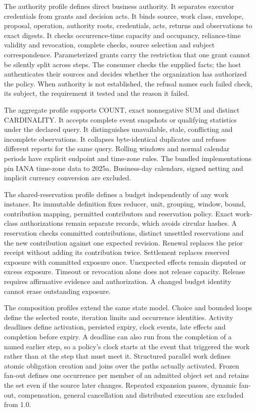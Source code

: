 \documentclass[
  american,
  11pt,
  letterpaper,
]{article}
\begin{document}
The authority profile defines direct business authority. It separates
executor credentials from grants and decision acts. It binds source,
work class, envelope, proposal, operation, authority roots, credentials,
acts, returns and observations to exact digests. It checks
occurrence-time capacity and occupancy, reliance-time validity and
revocation, complete checks, source selection and subject
correspondence. Parameterized grants carry the restriction that one
grant cannot be silently split across steps. The consumer checks the
supplied facts; the host authenticates their sources and decides whether
the organization has authorized the policy. When authority is not
established, the refusal names each failed check, its subject, the
requirement it tested and the reason it failed.

The aggregate profile supports COUNT, exact nonnegative SUM and distinct
CARDINALITY. It accepts complete event snapshots or qualifying
statistics under the declared query. It distinguishes unavailable,
stale, conflicting and incomplete observations. It collapses
byte-identical duplicates and refuses different reports for the same
query. Rolling windows and normal calendar periods have explicit
endpoint and time-zone rules. The bundled implementations pin IANA
time-zone data to 2025a. Business-day calendars, signed netting and
implicit currency conversion are excluded.

The shared-reservation profile defines a budget independently of any
work instance. Its immutable definition fixes reducer, unit, grouping,
window, bound, contribution mapping, permitted contributors and
reservation policy. Exact work-class authorizations remain separate
records, which avoids circular hashes. A reservation checks committed
contributions, distinct unsettled reservations and the new contribution
against one expected revision. Renewal replaces the prior receipt
without adding its contribution twice. Settlement replaces reserved
exposure with committed exposure once. Unexpected effects remain
disputed or excess exposure. Timeout or revocation alone does not
release capacity. Release requires affirmative evidence and
authorization. A changed budget identity cannot erase outstanding
exposure.

The composition profiles extend the same state model. Choice and bounded
loops define the selected route, iteration limits and occurrence
identities. Activity deadlines define activation, persisted expiry,
clock events, late effects and completion before expiry. A deadline can
also run from the completion of a named earlier step, so a policy's
clock starts at the event that triggered the work rather than at the
step that must meet it. Structured parallel work defines atomic
obligation creation and joins over the paths actually activated. Frozen
fan-out defines one occurrence per member of an admitted object set and
retains the set even if the source later changes. Repeated expansion
passes, dynamic fan-out, compensation, general cancellation and
distributed execution are excluded from 1.0.
\end{document}
